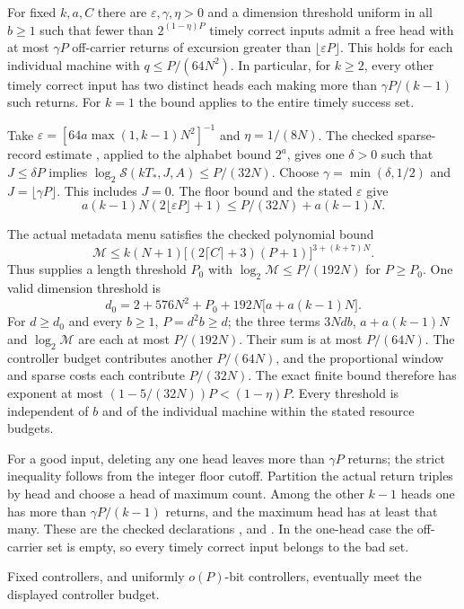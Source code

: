 \begin{theorem}\label{thm:returns}
For fixed $k,a,C$ there are $\varepsilon,\gamma,\eta>0$ and a dimension
threshold uniform in all $b\ge1$ such that fewer than $2^{(1-\eta)P}$
timely correct inputs admit a free head with at most $\gamma P$ off-carrier
returns of excursion greater than $\lfloor\varepsilon P\rfloor$.
This holds for each individual machine with
$q\le P/(64N^2)$. In particular, for $k\ge2$, every other timely correct
input has two distinct heads each making more than $\gamma P/(k-1)$ such
returns. For $k=1$ the bound applies to the entire timely success set.
\end{theorem}
\begin{outline}
Take $\varepsilon=[64a\max(1,k-1)N^2]^{-1}$ and $\eta=1/(8N)$.
The checked sparse-record estimate , applied
to the alphabet bound $2^a$, gives one $\delta>0$ such that
$J\le\delta P$ implies $\log_2\mathcal S(kT_*,J,A)\le P/(32N)$.
Choose $\gamma=\min(\delta,1/2)$ and $J=\lfloor\gamma P\rfloor$.
This includes $J=0$. The floor bound and the stated $\varepsilon$ give
\[
 a(k-1)N(2\lfloor\varepsilon P\rfloor+1)
 \le P/(32N)+a(k-1)N.
\]

The actual metadata menu satisfies the checked polynomial bound
\[
 \mathcal M\le k(N+1)
 \bigl[(2\lceil C\rceil+3)(P+1)\bigr]^{3+(k+7)N}.
\]
Thus  supplies a length threshold $P_0$
with $\log_2\mathcal M\le P/(192N)$ for $P\ge P_0$.
One valid dimension threshold is
\[
 d_0=2+576N^2+P_0+192N\bigl[a+a(k-1)N\bigr].
\]
For $d\ge d_0$ and every $b\ge1$, $P=d^2b\ge d$; the three terms
$3Ndb$, $a+a(k-1)N$ and $\log_2\mathcal M$ are each at most
$P/(192N)$. Their sum is at most $P/(64N)$.
The controller budget contributes another $P/(64N)$, and the proportional
window and sparse costs each contribute $P/(32N)$. The exact finite bound
therefore has exponent at most $(1-5/(32N))P<(1-\eta)P$.
Every threshold is independent of $b$ and of the individual machine within
the stated resource budgets.

For a good input, deleting any one head leaves more than $\gamma P$ returns;
the strict inequality follows from the integer floor cutoff. Partition the
actual return triples by head and choose a head of maximum count. Among the
other $k-1$ heads one has more than $\gamma P/(k-1)$ returns, and the maximum
head has at least that many. These are the checked declarations
,  and
. In the one-head case the off-carrier set is empty,
so every timely correct input belongs to the bad set.
\end{outline}
Fixed controllers, and uniformly $o(P)$-bit controllers, eventually meet the
displayed controller budget.
